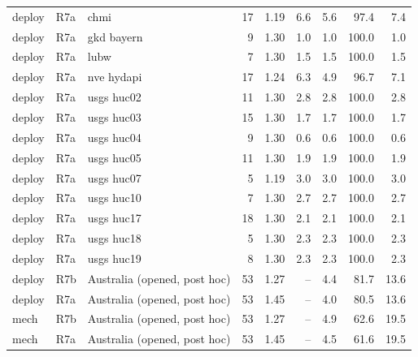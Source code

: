 \begin{table}
{\begin{tabular}{lllrrrrrr}
deploy & R7a & chmi & 17 & 1.19 & 6.6 & 5.6 & 97.4 & 7.4 \\
deploy & R7a & gkd bayern & 9 & 1.30 & 1.0 & 1.0 & 100.0 & 1.0 \\
deploy & R7a & lubw & 7 & 1.30 & 1.5 & 1.5 & 100.0 & 1.5 \\
deploy & R7a & nve hydapi & 17 & 1.24 & 6.3 & 4.9 & 96.7 & 7.1 \\
deploy & R7a & usgs huc02 & 11 & 1.30 & 2.8 & 2.8 & 100.0 & 2.8 \\
deploy & R7a & usgs huc03 & 15 & 1.30 & 1.7 & 1.7 & 100.0 & 1.7 \\
deploy & R7a & usgs huc04 & 9 & 1.30 & 0.6 & 0.6 & 100.0 & 0.6 \\
deploy & R7a & usgs huc05 & 11 & 1.30 & 1.9 & 1.9 & 100.0 & 1.9 \\
deploy & R7a & usgs huc07 & 5 & 1.19 & 3.0 & 3.0 & 100.0 & 3.0 \\
deploy & R7a & usgs huc10 & 7 & 1.30 & 2.7 & 2.7 & 100.0 & 2.7 \\
deploy & R7a & usgs huc17 & 18 & 1.30 & 2.1 & 2.1 & 100.0 & 2.1 \\
deploy & R7a & usgs huc18 & 5 & 1.30 & 2.3 & 2.3 & 100.0 & 2.3 \\
deploy & R7a & usgs huc19 & 8 & 1.30 & 2.3 & 2.3 & 100.0 & 2.3 \\
deploy & R7b & Australia (opened, post hoc) & 53 & 1.27 & -- & 4.4 & 81.7 & 13.6 \\
deploy & R7a & Australia (opened, post hoc) & 53 & 1.45 & -- & 4.0 & 80.5 & 13.6 \\
mech & R7b & Australia (opened, post hoc) & 53 & 1.27 & -- & 4.9 & 62.6 & 19.5 \\
mech & R7a & Australia (opened, post hoc) & 53 & 1.45 & -- & 4.5 & 61.6 & 19.5 \\
\bottomrule
\end{tabular}
}
\end{table}

